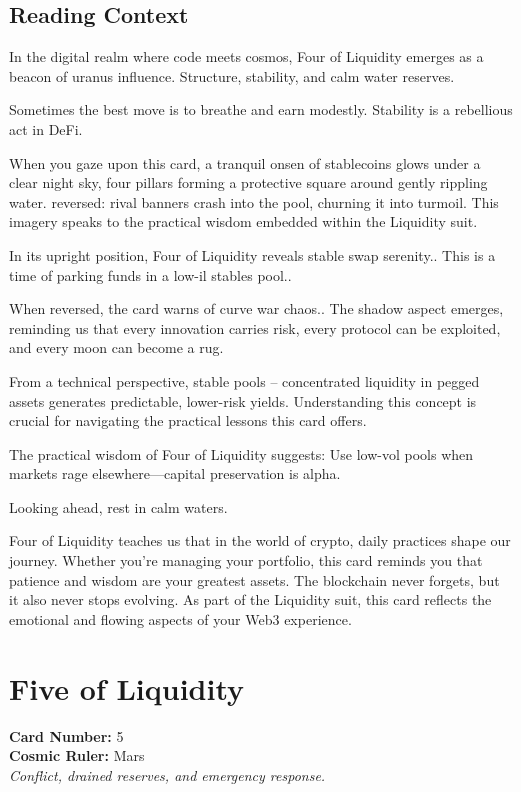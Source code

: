 \documentclass[11pt,oneside]{book}
\begin{document}
\begin{minipage}[t]{0.55\textwidth}
  \subsection*{Reading Context}
  In the digital realm where code meets cosmos, Four of Liquidity emerges as a beacon of uranus influence. Structure, stability, and calm water reserves.

  Sometimes the best move is to breathe and earn modestly. Stability is a rebellious act in DeFi.

  When you gaze upon this card, a tranquil onsen of stablecoins glows under a clear night sky, four pillars forming a protective square around gently rippling water. reversed: rival banners crash into the pool, churning it into turmoil. This imagery speaks to the practical wisdom embedded within the Liquidity suit.

  In its upright position, Four of Liquidity reveals stable swap serenity.. This is a time of parking funds in a low-il stables pool..

  When reversed, the card warns of curve war chaos.. The shadow aspect emerges, reminding us that every innovation carries risk, every protocol can be exploited, and every moon can become a rug.

  From a technical perspective, stable pools – concentrated liquidity in pegged assets generates predictable, lower-risk yields. Understanding this concept is crucial for navigating the practical lessons this card offers.

  The practical wisdom of Four of Liquidity suggests: Use low-vol pools when markets rage elsewhere—capital preservation is alpha.

  Looking ahead, rest in calm waters.

  Four of Liquidity teaches us that in the world of crypto, daily practices shape our journey. Whether you're managing your portfolio, this card reminds you that patience and wisdom are your greatest assets. The blockchain never forgets, but it also never stops evolving. As part of the Liquidity suit, this card reflects the emotional and flowing aspects of your Web3 experience.

\end{minipage}

\newpage
\section*{Five of Liquidity}

\begin{minipage}[t]{0.55\textwidth}
  \vspace{0pt}
  \textbf{Card Number:} 5\\  \textbf{Cosmic Ruler:} Mars\\  \textit{Conflict, drained reserves, and emergency response.}
\end{minipage}
\end{document}
